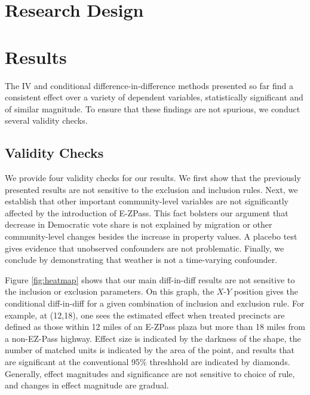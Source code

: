 \section{Research Design}




\section{Results}




The IV and conditional difference-in-difference methods presented so far find a consistent effect over a variety of dependent variables, statistically significant and of similar magnitude. To ensure that these findings are not spurious, we conduct several validity checks. 

\subsection{Validity Checks}
We provide four validity checks for our results. We first show that the previously presented results are not sensitive to the exclusion and inclusion rules. Next, we establish that other important community-level variables are not significantly affected by the introduction of E-ZPass. This fact bolsters our argument that decrease in Democratic vote share is not explained by migration or other community-level changes besides the increase in property values. A placebo test gives evidence that unobserved confounders are not problematic. Finally, we conclude by demonstrating that weather is not a time-varying confounder.

Figure \vref{fig:heatmap} shows that our main diff-in-diff results are not sensitive to the inclusion or exclusion parameters. On this graph, the $X$-$Y$ position gives the conditional diff-in-diff for a given combination of inclusion and exclusion rule. For example, at (12,18), one sees the estimated effect when treated precincts are defined as those within 12 miles of an E-ZPass plaza but more than 18 miles from a non-EZ-Pass highway. Effect size is indicated by the darkness of the shape, the number of matched units is indicated by the area of the point, and results that are significant at the conventional 95\% threshhold are indicated by diamonds. Generally, effect magnitudes and significance are not sensitive to choice of rule, and changes in effect magnitude are gradual. 

 


